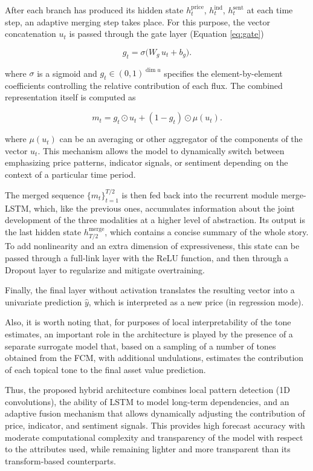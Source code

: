 After each branch has produced its hidden state $h_t^{\mathrm{price}}$, $h_t^{\mathrm{ind}}$, $h_t^{\mathrm{sent}}$
at each time step, an adaptive merging step takes place. For this purpose, the vector concatenation $u_t$ is passed
through the gate layer (Equation \ref{eq:gate})

\begin{equation}\label{eq:gate}
    g_t = \sigma\bigl(W_g\,u_t + b_g\bigr).
\end{equation}

where $\sigma$ is a sigmoid and $g_t\in(0,1)^{\dim u}$ specifies the element-by-element coefficients controlling
the relative contribution of each flux. The combined representation itself is computed as

\begin{equation}
    m_t = g_t\odot u_t + (1-g_t)\odot\mu(u_t).
\end{equation}

where $\mu(u_t)$ can be an averaging or other aggregator of the components of the vector $u_t$. This mechanism
allows the model to dynamically switch between emphasizing price patterns, indicator signals, or sentiment
depending on the context of a particular time period.

The merged sequence $\{m_t\}_{t=1}^{T/2}$ is then fed back into the recurrent module merge-LSTM, which, like
the previous ones, accumulates information about the joint development of the three modalities at a higher
level of abstraction. Its output is the last hidden state $h_{T/2}^{\mathrm{merge}}$, which contains
a concise summary of the whole story. To add nonlinearity and an extra dimension of expressiveness, this
state can be passed through a full-link layer with the $\mathrm{ReLU}$ function, and then through a Dropout
layer to regularize and mitigate overtraining.

Finally, the final layer without activation translates the resulting vector into a univariate prediction
$\hat y$, which is interpreted as a new price (in regression mode).

Also, it is worth noting that, for purposes of local interpretability of the tone estimates, an important
role in the architecture is played by the presence of a separate surrogate model that, based on a sampling
of a number of tones obtained from the FCM, with additional undulations, estimates the contribution
of each topical tone to the final asset value prediction.

Thus, the proposed hybrid architecture combines local pattern detection (1D convolutions), the ability
of LSTM to model long-term dependencies, and an adaptive fusion mechanism that allows dynamically adjusting
the contribution of price, indicator, and sentiment signals. This provides high forecast accuracy with moderate
computational complexity and transparency of the model with respect to the attributes used, while remaining
lighter and more transparent than its transform-based counterparts.


